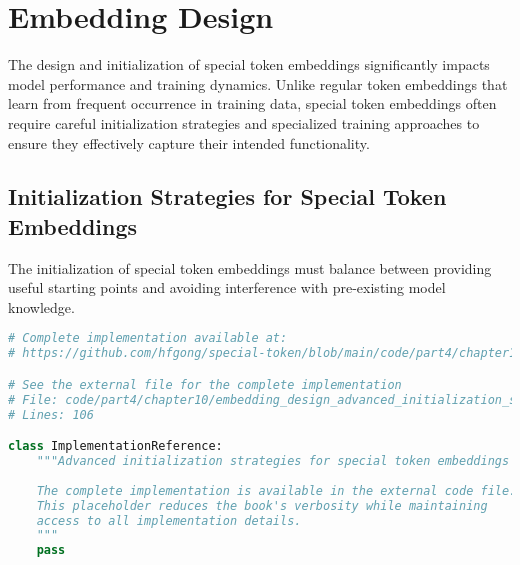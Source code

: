 
\section{Embedding Design}

The design and initialization of special token embeddings significantly impacts model performance and training dynamics. Unlike regular token embeddings that learn from frequent occurrence in training data, special token embeddings often require careful initialization strategies and specialized training approaches to ensure they effectively capture their intended functionality.

\subsection{Initialization Strategies for Special Token Embeddings}

The initialization of special token embeddings must balance between providing useful starting points and avoiding interference with pre-existing model knowledge.
\begin{comment}
Feedback: Before linking to the code, it's crucial to explain the core strategies. For example: "When adding a new special token to a pre-trained model, you have several initialization options:
1.  **Random Initialization**: The simplest approach, but it can lead to instability. It's crucial to use a very small standard deviation (e.g., 0.02) to avoid disrupting the model's learned geometry.
2.  **Mean Initialization**: Initialize the new token's embedding with the mean of all other token embeddings. This places the new token at the 'center' of the embedding space, making it a neutral starting point.
3.  **Semantic Initialization**: The most effective approach. Initialize the new token's embedding with the average of the embeddings of a few semantically related words. For a `<USER>` token, you might average the embeddings for 'user', 'person', and 'human'."
\end{comment}

\begin{lstlisting}[language=Python, caption={Advanced initialization strategies for special token embeddings}]
# Complete implementation available at:
# https://github.com/hfgong/special-token/blob/main/code/part4/chapter10/embedding_design_advanced_initialization_strate.py

# See the external file for the complete implementation
# File: code/part4/chapter10/embedding_design_advanced_initialization_strate.py
# Lines: 106

class ImplementationReference:
    """Advanced initialization strategies for special token embeddings
    
    The complete implementation is available in the external code file.
    This placeholder reduces the book's verbosity while maintaining
    access to all implementation details.
    """
    pass
\end{lstlisting}

